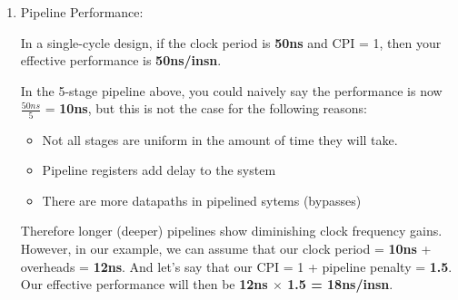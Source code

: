 \documentclass[12pt]{article}
\newenvironment{QandA}{\begin{enumerate}[label=\bfseries\alph*.]\bfseries}
                      {\end{enumerate}}
\newenvironment{answered}{\par\quad\normalfont}{}
\begin{document}
\begin{QandA}
\begin{answered}
    \textbf{Cycle 3:} 
    
    In the third cycle, the ADD instruction enters the \textit{Execute Stage} and proceeds to use the \textbf{ALU} to execute an ADD operation on the two operands. 
    
    \quad In this same cycle, the LOAD instruction enters the \textit{Decode Stage} and the next instruction (STORE) enters the \textit{Fetch Stage}.
    
    \textbf{Cycle 4:}
    
    In the fourth cycle, the ADD instruction goes through the \textit{Memory Stage} even though there's nothing for it to do there. It needs to write the resulting value to register R3, which it will do in the next step. Can be thought of as a \textbf{NO-OP} stage for the ADD instruction.
    
    \quad The other two instructions proceed down the pipeline to \textit{Execute Stage} and \textit{Decode Stage} respectively.
    
    \textbf{Cycle 5:}
    
    In the fifth cycle, the ADD instruction enters the \textit{Writeback Stage}, and then performs a write-back of the ALU result to the \textit{Register File}, selecting the correct destination register.
    
    \quad The other two instructions proceed down the pipeline to \textit{Memory Stage} and \textit{Execute Stage} respectively. 
    
    \textbf{Cycle 6 \& Cycle 7:}
    
    LOAD and STORE pass through the last two stages of the pipeline over the these two cycles.
    
    \end{answered}
    
    \item Pipeline Performance:
    \begin{answered}
    In a single-cycle design, if the clock period is \textbf{50ns} and CPI = 1, then your effective performance is \textbf{50ns/insn}.
    
    In the 5-stage pipeline above, you could naively say the performance is now $\frac{50ns}{5}$ = \textbf{10ns}, but this is not the case for the following reasons:
    \begin{itemize}
        \item Not all stages are uniform in the amount of time they will take.
        \item Pipeline registers add delay to the system
        \item There are more datapaths in pipelined sytems (bypasses)
    \end{itemize}
    
    Therefore longer (deeper) pipelines show diminishing clock frequency gains. However, in our example, we can assume that our clock period = \textbf{10ns} + overheads = \textbf{12ns}. And let's say that our CPI = 1 + pipeline penalty = \textbf{1.5}. Our effective performance will then be \textbf{12ns $\times$ 1.5 = 18ns/insn}.
    \end{answered}


\end{QandA}
\end{document}
